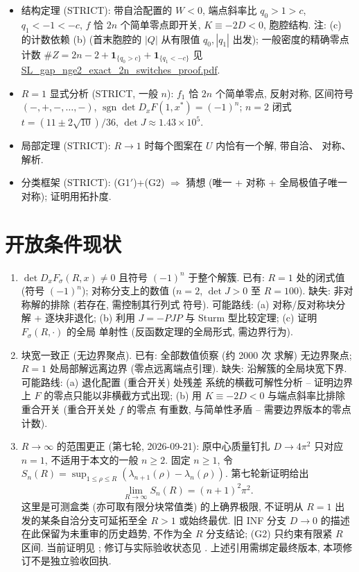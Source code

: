 \documentclass[UTF8]{ctexart}
\begin{document}
\begin{itemize}
	\item 结构定理 (STRICT): 带自洽配置的 $W<0$, 端点斜率比
	$q_0>1>c$, $q_1<-1<-c$, $f$ 恰 $2n$ 个简单零点即开关, $K\equiv-2D<0$,
	胞腔结构. 注: (c) 的计数依赖 (b) (首末胞腔的 $|Q|$ 从有限值 $q_0,|q_1|$
	出发); 一般密度的精确零点计数
	$\#Z=2n-2+\mathbf1_{\{q_0>c\}}+\mathbf1_{\{q_1<-c\}}$ 见
	\url{SL_gap_nge2_exact_2n_switches_proof.pdf}.
	\item $R=1$ 显式分析 (STRICT, 一般 $n$): $f_1$ 恰 $2n$ 个简单零点,
	反射对称, 区间符号 $(-,+,-,\dots,-)$, $\operatorname{sgn}\det
	D_xF(1,x^*)=(-1)^n$; $n=2$ 闭式 $t=(11\pm2\sqrt{10})/36$,
	$\det J\approx1.43\times10^5$.
	\item 局部定理 (STRICT): $R\to1$ 时每个图案在 $U$ 内恰有一个解, 带自洽、
	对称、解析.
	\item 分类框架 (STRICT): (G1$'$)+(G2) $\Rightarrow$ 猜想 (唯一 + 对称 +
	全局极值子唯一对称); 证明用拓扑度.
\end{itemize}

\section{开放条件现状}\label{sec:open}

\begin{enumerate}
	\item[(G1$'$)] $\det D_xF_\sigma(R,x)\neq0$ 且符号 $(-1)^n$ 于整个解簇.
	已有: $R=1$ 处的闭式值 (符号 $(-1)^n$); 对称分支上的数值 ($n=2$,
	$\det J>0$ 至 $R=100$). 缺失: 非对称解的排除 (若存在, 需控制其行列式
	符号). 可能路线: (a) 对称/反对称块分解 + 逐块非退化; (b) 利用
	$J=-PJP$ 与 Sturm 型比较定理; (c) 证明 $F_\sigma(R,\cdot)$ 的全局
	单射性 (反函数定理的全局形式, 需边界行为).
	\item[(G2)] 块宽一致正 (无边界聚点). 已有: 全部数值侦察 (约 2000 次
	求解) 无边界聚点; $R=1$ 处局部解远离边界 (零点远离端点引理).
	缺失: 沿解簇的全局块宽下界. 可能路线: (a) 退化配置 (重合开关) 处残差
	系统的横截可解性分析 -- 证明边界上 $F$ 的零点只能以非横截方式出现;
	(b) 用 $K\equiv-2D<0$ 与端点斜率比排除重合开关 (重合开关处 $f$ 的零点
	有重数, 与简单性矛盾 -- 需要边界版本的零点计数).
	\item $R\to\infty$ 的范围更正 (第七轮, 2026-09-21): 原中心质量钉扎
	$D\to4\pi^2$ 只对应 $n=1$, 不适用于本文的一般 $n\ge2$.
	固定 $n\ge1$, 令 $S_n(R)=\sup_{1\le\rho\le R}
	(\lambda_{n+1}(\rho)-\lambda_n(\rho))$. 第七轮新证明给出
	\[
	\lim_{R\to\infty}S_n(R)=(n+1)^2\pi^2.
	\]
	这里是可测盒类 (亦可取有限分块常值类) 的上确界极限,
	不证明从 $R=1$ 出发的某条自洽分支可延拓至全 $R>1$ 或始终最优.
	旧 INF 分支 $D\to0$ 的描述在此保留为未重审的历史趋势,
	不作为全 $R$ 分支结论; (G2) 只约束有限紧 $R$ 区间.
	当前证明见 ;
	修订与实际验收状态见 .
	上述引用需绑定最终版本, 本项修订不是独立验收回执.
\end{enumerate}
\end{document}
